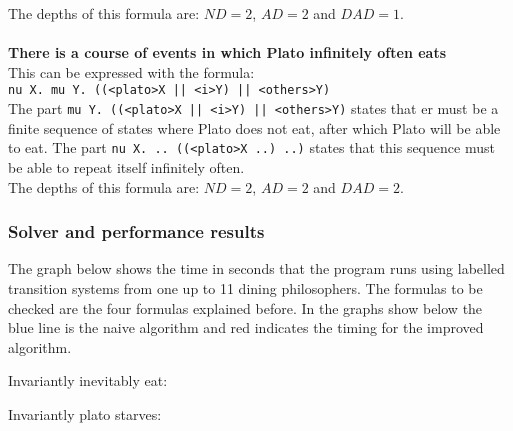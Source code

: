 \documentclass[10pt,a4paper]{article}
\begin{document}
The depths of this formula are: $ND = 2$, $AD = 2$ and $DAD = 1$.
\\\\
\textbf{There is a course of events in which Plato infinitely often eats}\\
This can be expressed with the formula:\\
{\tt nu X. mu Y. ((<plato>X || <i>Y) || <others>Y)}\\
The part {\tt mu Y. ((<plato>X || <i>Y) || <others>Y)} states that er must be a finite sequence of states where Plato does not eat, after which Plato will be able to eat. The part {\tt nu X. .. ((<plato>X ..) ..)} states that this sequence must be able to repeat itself infinitely often.\\
The depths of this formula are: $ND = 2$, $AD = 2$ and $DAD = 2$.

\subsubsection{Solver and performance results}

The graph below shows the time in seconds that the program runs using labelled transition systems from one up to 11 dining philosophers. The formulas to be checked are the four formulas explained before. In the graphs show below the blue line is the naive algorithm and red indicates the timing for the improved algorithm.

Invariantly inevitably eat:


Invariantly plato starves:

\end{document}
